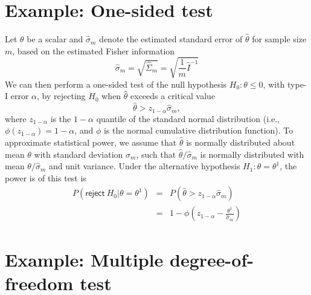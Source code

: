 \documentclass{article}
\begin{document}
\section{Example: One-sided test}
\noindent Let $\theta$ be a scalar and $\hat{\sigma}_m$ denote the estimated standard error of $\hat{\theta}$ for sample size $m$, based on the estimated Fisher information
$$
\hat{\sigma}_m = \sqrt{\hat{\Sigma}_m} = \sqrt{\frac{1}{m}\hat{I}^{-1}}
$$
We can then perform a one-sided test of the null hypothesis $H_0: \theta \leq 0$, with type-I error $\alpha$, by rejecting $H_0$ when $\hat{\theta}$ exceeds a critical value
$$
\hat{\theta} > z_{1-\alpha}\hat{\sigma}_m,
$$
where $z_{1-\alpha}$ is the $1-\alpha$ quantile of the standard normal distribution (i.e., $\phi(z_{1-\alpha}) = 1-\alpha$, and $\phi$ is the normal cumulative distribution function). To approximate statistical power, we assume that $\hat{\theta}$ is normally distributed about mean $\theta$ with standard deviation $\hat{\sigma}_m$, such that $\hat{\theta}/\hat{\sigma}_m$ is normally distributed with mean $\theta/\hat{\sigma}_m$ and unit variance. Under the alternative hypothesis $H_1: \theta = \theta^1$, the power is of this test is 
\begin{eqnarray}
P(\mathsf{reject}\ H_0 | \theta = \theta^1) &=& P\left(\hat{\theta} > z_{1-\alpha}\hat{\sigma}_m\right) \nonumber \\
&=& 1-\phi\left(z_{1-\alpha} - \frac{\theta^1}{\hat{\sigma}_m}\right) \nonumber
\end{eqnarray}

\section{Example: Multiple degree-of-freedom test}
\end{document}
